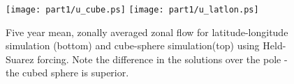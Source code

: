 \begin{figure}
 \begin{center}
   \texttt{[image: part1/u\_cube.ps]}
   \texttt{[image: part1/u\_latlon.ps]}
 \end{center}
\caption{
Five year mean, zonally averaged zonal flow for
latitude-longitude simulation (bottom) and cube-sphere simulation(top) using
Held-Suarez forcing. Note the difference in the solutions over the pole -
the cubed sphere is superior.
}
\label{fig:hs_zave_u}
\end{figure}
